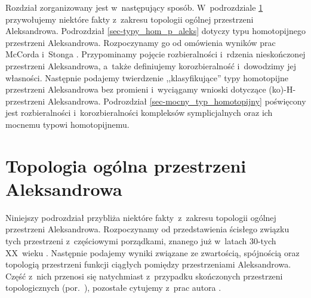 Rozdział zorganizowany jest w~następujący sposób. W~podrozdziale \ref{sec-top_ogol_p_aleks} przywołujemy niektóre fakty z~zakresu topologii ogólnej przestrzeni Aleksandrowa. Podrozdział \ref{sec-typy_hom_p_aleks} dotyczy typu homotopijnego przestrzeni Aleksandrowa. Rozpoczynamy go od omówienia wyników prac McCorda \cite{McCord66} i~Stonga \cite{Stong66}. Przypominamy pojęcie rozbieralności i~rdzenia nieskończonej przestrzeni Aleksandrowa, a~także definiujemy korozbieralność i~dowodzimy jej własności. Następnie podajemy twierdzenie ,,klasyfikujące'' typy homotopijne przestrzeni Aleksandrowa bez promieni i~wyciągamy wnioski dotyczące (ko)-H-przestrzeni Aleksandrowa. Podrozdział \ref{sec-mocny_typ_homotopijny} poświęcony jest rozbieralności i~korozbieralności kompleksów symplicjalnych oraz ich mocnemu typowi homotopijnemu.


\section{Topologia ogólna przestrzeni Aleksandrowa}\label{sec-top_ogol_p_aleks}
Niniejszy podrozdział przybliża niektóre fakty~z~zakresu topologii ogólnej przestrzeni Aleksandrowa. Rozpoczynamy od przedstawienia ścisłego związku tych przestrzeni z~częściowymi porządkami, znanego już w~latach \mbox{30-tych} XX~wieku \cite{Alexandroff37,Tucker36,Ronse}. Następnie podajemy wyniki związane ze zwartością, spójnością oraz topologią przestrzeni funkcji ciągłych pomiędzy przestrzeniami Aleksandrowa. Część z~nich przenosi się natychmiast z~przypadku skończonych przestrzeni topologicznych (por.~\cite{May08,Stong66}),  pozostałe cytujemy z~prac autora \cite{Kukiela10a,Kukiela10}.





